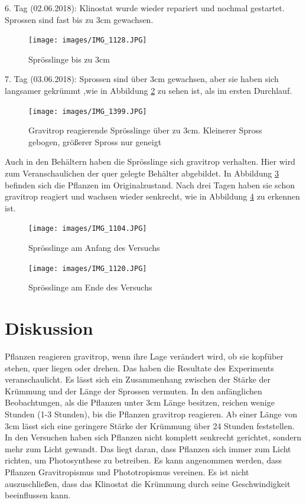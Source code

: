 \documentclass[
11pt, 
ngerman,
listof=totocnumbered,
oneside,
bibliography=totocnumbered,
abstracton
]{scrreprt}
\begin{document}
6. Tag (02.06.2018): Klinostat wurde wieder repariert und nochmal gestartet. Sprossen sind fast bis zu 3cm gewachsen.

\begin{figure}[H]
	\centering 
	\texttt{[image: images/IMG\_1128.JPG]}
	\caption{Sprösslinge bis zu 3cm \label{Foto 4}}
\end{figure}

7. Tag (03.06.2018): Sprossen sind über 3cm gewachsen, aber sie haben sich langsamer gekrümmt ,wie in Abbildung \ref{Foto 5} zu sehen ist, als im ersten Durchlauf.

\begin{figure}[H]
	 \centering 
  \texttt{[image: images/IMG\_1399.JPG]}
  	\caption{Gravitrop reagierende Sprösslinge über zu 3cm. Kleinerer Spross gebogen, größerer Spross nur geneigt \label{Foto 5}}
\end{figure} 

 Auch in den Behältern haben die Sprösslinge sich gravitrop verhalten. Hier wird zum Veranschaulichen der quer gelegte Behälter abgebildet.
 In Abbildung \ref{Foto 6} befinden sich die Pflanzen im Originalzustand. Nach drei Tagen haben sie schon gravitrop reagiert und wachsen wieder senkrecht, wie in Abbildung \ref{Foto 7} zu erkennen ist.

\begin{figure}[H]
	\centering 
	\texttt{[image: images/IMG\_1104.JPG]}
	\caption{Sprösslinge am Anfang des Versuchs \label{Foto 6}}
\end{figure} 

\begin{figure}[H]
	\centering 
	\texttt{[image: images/IMG\_1120.JPG]}
	\caption{Sprösslinge am Ende des Versuchs \label{Foto 7}}
\end{figure} 


\section{Diskussion}

Pflanzen reagieren gravitrop, wenn ihre Lage verändert wird, ob sie kopfüber stehen, quer liegen oder drehen. Das haben die Resultate des Experiments  veranschaulicht. Es lässt sich ein Zusammenhang zwischen der Stärke der Krümmung und der Länge der Sprossen vermuten. In den anfänglichen Beobachtungen, als die Pflanzen unter 3cm Länge besitzen, reichen wenige Stunden (1-3 Stunden), bis die Pflanzen gravitrop reagieren. Ab einer Länge von 3cm lässt sich eine geringere Stärke der Krümmung über 24 Stunden feststellen.
In den Versuchen haben sich Pflanzen nicht komplett senkrecht gerichtet, sondern mehr zum Licht gewandt. Das liegt daran, dass Pflanzen sich immer zum Licht richten, um Photosynthese zu betreiben. Es kann angenommen werden, dass Pflanzen Gravitropismus und Phototropismus vereinen.
Es ist nicht auszuschließen, dass das Klinostat die Krümmung durch seine Geschwindigkeit beeinflussen kann.
\end{document}
